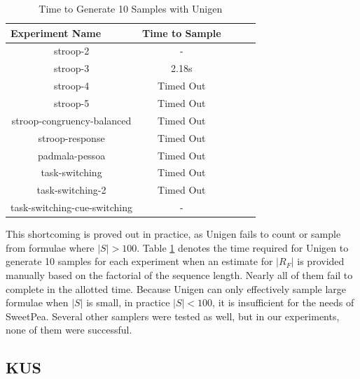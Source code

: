 \begin{table}[htb]
  \centering
  \caption{Time to Generate 10 Samples with Unigen}
\begin{tabular}{|c|c|c|c|c|}
\hline
\multicolumn{1}{|l|}{Experiment Name} & Time to Sample  \\ \hline
stroop-2                              & -               \\ \hline
stroop-3                              & 2.18s           \\ \hline
stroop-4                              & Timed Out       \\ \hline
stroop-5                              & Timed Out       \\ \hline
stroop-congruency-balanced            & Timed Out       \\ \hline
stroop-response                       & Timed Out       \\ \hline
padmala-pessoa                        & Timed Out       \\ \hline
task-switching                        & Timed Out       \\ \hline
task-switching-2                      & Timed Out       \\ \hline
task-switching-cue-switching          & -               \\ \hline
\end{tabular}
\label{tab:benchmark_experiments_unigen}
\end{table}

This shortcoming is proved out in practice, as Unigen fails to count or sample from formulae where $|S| > 100$. Table \ref{tab:benchmark_experiments_unigen} denotes the time required for Unigen to generate 10 samples for each experiment when an estimate for $|R_F|$ is provided manually based on the factorial of the sequence length. Nearly all of them fail to complete in the allotted time. Because Unigen can only effectively sample large formulae when $|S|$ is small, in practice $|S| < 100$, it is insufficient for the needs of SweetPea. Several other samplers were tested as well, but in our experiments, none of them were successful.


\subsection{KUS}


